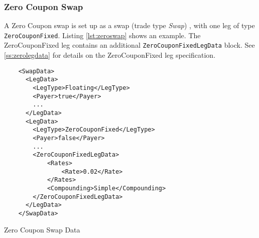 \subsubsection{Zero Coupon Swap}

\ifdefined{}\fi

A Zero Coupon swap is set up as a swap (trade type \emph{Swap}) , with one leg of type {\tt ZeroCouponFixed}. Listing \ref{lst:zeroswap} shows an
example. The ZeroCouponFixed leg contains an additional {\tt ZeroCouponFixedLegData} block. See \ref{ss:zerolegdata} for details on the ZeroCouponFixed leg
specification.

\begin{listing}[H]
\begin{verbatim}
    <SwapData>
      <LegData>
        <LegType>Floating</LegType>
        <Payer>true</Payer>
        ...
      </LegData>
      <LegData>
        <LegType>ZeroCouponFixed</LegType>
        <Payer>false</Payer>
        ...
        <ZeroCouponFixedLegData>
            <Rates>
                <Rate>0.02</Rate>
            </Rates>
            <Compounding>Simple</Compounding>
        </ZeroCouponFixedLegData>
      </LegData>
    </SwapData>
\end{verbatim}
\caption{Zero Coupon Swap Data}
\label{lst:zeroswap}
\end{listing}
